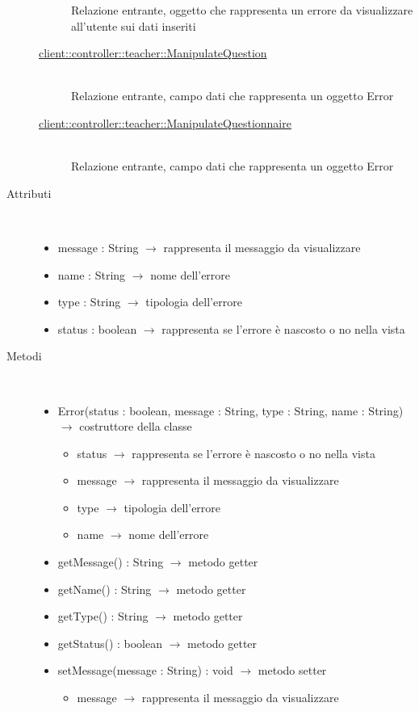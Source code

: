\begin{description}
\begin{description}
	Relazione entrante, oggetto che rappresenta un errore da visualizzare all'utente sui dati inseriti
	\item[\hyperlink{client::controller::teacher::ManipulateQuestion}{client::controller::teacher::ManipulateQuestion}] \hfill \\
	Relazione entrante, campo dati che rappresenta un oggetto Error
	\item[\hyperlink{client::controller::teacher::ManipulateQuestionnaire}{client::controller::teacher::ManipulateQuestionnaire}] \hfill \\
	Relazione entrante, campo dati che rappresenta un oggetto Error
\end{description}

\item[Attributi] \hfill \\
\vspace{-7mm}
\begin{itemize}
	\item message : String $\rightarrow$ rappresenta il messaggio da visualizzare
	\item name : String $\rightarrow$ nome dell'errore
	\item type : String $\rightarrow$ tipologia dell'errore
	\item status : boolean $\rightarrow$ rappresenta se l'errore è nascosto o no nella vista
\end{itemize}

\item[Metodi] \hfill \\
\vspace{-7mm}
\begin{itemize}
	\item Error(status : boolean, message : String, type : String, name : String) $\rightarrow$ costruttore della classe\begin{itemize}
		\item status $\rightarrow$ rappresenta se l'errore è nascosto o no nella vista
		\item message $\rightarrow$ rappresenta il messaggio da visualizzare
		\item type $\rightarrow$ tipologia dell'errore
		\item name $\rightarrow$ nome dell'errore
	\end{itemize}
	
	\item getMessage() : String $\rightarrow$ metodo getter
	\item getName() : String $\rightarrow$ metodo getter
	\item getType() : String $\rightarrow$ metodo getter
	\item getStatus() : boolean $\rightarrow$ metodo getter
	\item setMessage(message : String) : void $\rightarrow$ metodo setter\begin{itemize}
		\item message $\rightarrow$ rappresenta il messaggio da visualizzare
	\end{itemize}
	

\end{itemize}
\end{description}
